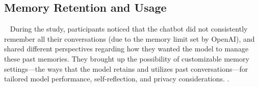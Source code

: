 \subsection{ Memory Retention and Usage }~\label{memory}
During the study, participants noticed that the chatbot did not consistently remember all their conversations (due to the memory limit set by OpenAI), and shared different perspectives regarding how they wanted the model to manage these past memories.
They brought up the possibility of customizable memory settings---the ways that the model retains and utilizes past conversations---for tailored model performance, self-reflection, and privacy considerations. 
.

\vspace{-1mm}
